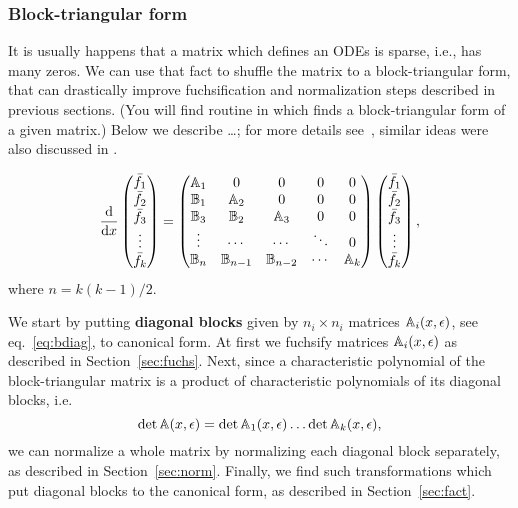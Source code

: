 \documentclass[12pt,a4paper]{article}
\def\M#1{\mathbb{#1}} %
\begin{document}
\subsubsection{Block-triangular form}

It is usually happens that a matrix which defines an ODEs is sparse, i.e., has many zeros.
We can use that fact to shuffle the matrix to a block-triangular form, that can drastically improve fuchsification and normalization steps described in previous sections.
(You will find  routine in \fuchsia which finds a block-triangular form of a given matrix.)
Below we describe \ldots ; for more details see~\cite[Section 7]{Lee15}, similar ideas were also discussed in \cite{Git15}.

\begin{equation}
\label{eq:bdiag}
\frac{\D}{\D x}
\left(
\begin{matrix}
  \bar{f_1} \\ \bar{f_2} \\ \bar{f_3} \\ \vdots \\ \bar{f_k}
\end{matrix}
\right)
= 
\left(
\begin{matrix}
  \M A_1 & 0      & 0 & 0 & 0
\\
  \M B_1 & \M A_2 & 0 & 0 & 0
\\
  \M B_3 & \M B_2 & \M A_3 & 0 & 0
\\
  \vdots & \cdots & \cdots & \ddots & 0
\\
  \M B_n & \M B_{n-1} & \M B_{n-2} & \cdots & \M A_k
\end{matrix}
\right)
\left(
\begin{matrix}
  \bar{f_1} \\ \bar{f_2} \\ \bar{f_3} \\ \vdots \\ \bar{f_k}
\end{matrix}
\right)
,
\end{equation}
where $n=k(k-1)/2$.

We start by putting {\bf diagonal blocks} given by $n_i \times n_i$ matrices $\M A_i(x,\eps)$, see eq.~\eqref{eq:bdiag}, to canonical form.
At first we fuchsify matrices $\M A_i(x,\eps)$ as described in Section~\ref{sec:fuchs}.
Next, since a characteristic polynomial of the block-triangular matrix is a product of characteristic polynomials of its diagonal blocks, i.e.
\begin{equation}
  \det{\M A(x,\eps)} = \det{\M A_1(x,\eps)} \ldots  \det{\M A_k(x,\eps)}
  ,
\end{equation}
we can normalize a whole matrix by normalizing each diagonal block separately, as described in Section~\ref{sec:norm}.
Finally, we find such transformations which put diagonal blocks to the canonical form, as described in Section~\ref{sec:fact}.
\end{document}
